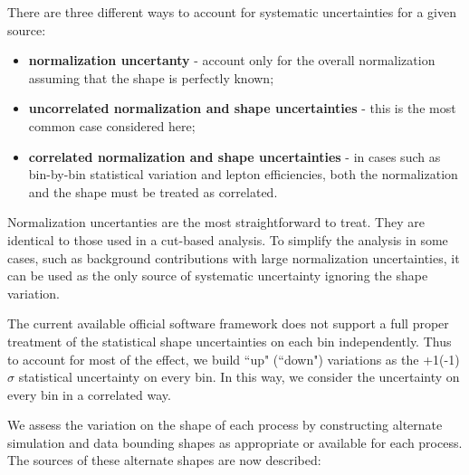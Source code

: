 There are three different ways to account for systematic uncertainties for a
given source:

\begin{itemize}
  \item {\bf normalization uncertanty} - account only for the overall
    normalization assuming that the shape is perfectly known;
  \item {\bf uncorrelated normalization and shape uncertainties} - this is
    the most common case considered here;
  \item {\bf correlated normalization and shape uncertainties} - in cases 
    such as bin-by-bin statistical variation and lepton efficiencies,
    both the normalization and the shape must be treated as correlated.
\end{itemize}

Normalization uncertanties are the most straightforward to treat. They
are identical to those used in a cut-based analysis. To simplify the
analysis in some cases, such as background contributions with
large normalization uncertainties, it can be used as the only source of
systematic uncertainty ignoring the shape variation.

The current available official software framework does not support a full proper treatment of the statistical
shape uncertainties on each bin independently. 
Thus to account for most of the effect, we build ``up" (``down") variations as the
+1(-1)$\sigma$ statistical uncertainty on every bin. In this way, we
consider the uncertainty on every bin in a correlated way.

We assess the variation on the shape of each process by constructing alternate simulation
and data bounding shapes as appropriate or available for each process.
The sources of these alternate shapes are now described:

